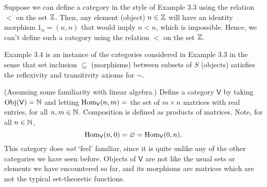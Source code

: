 \begin{xca}
Suppose we can define a category in the style of Example 3.3 using the relation
$<$ on the set $\mathbb{Z}$. Then, any element (object) $n \in \mathbb{Z}$ will have an identity
morphism $1_n = (n, n)$ that would imply $n < n$, which is impossible. Hence,
we can't define such a category using the relation $<$ on the set $\mathbb{Z}$.
\end{xca}

\begin{xca}
Example 3.4 is an instance of the categories considered in Example 3.3 in the
sense that set inclusion $\subseteq$ (morphisms) between subsets of $S$
(objects) satisfies the reflexivity and transitivity axioms for $\sim$.
\end{xca}

\begin{xca}
(Assuming some familiarity with linear algebra.) Define a category $\mathsf{V}$
by taking $\operatorname{Obj}(\mathsf{V}) = \mathbb{N}$ and letting $\operatorname{Hom}_{\mathsf{V}}(n, m) =$
the set of $m \times n$ matrices with real entries, for all $n, m \in \mathbb{N}$.
Composition is defined as products of matrices. Note, for all $n \in \mathbb{N}$,
\[
\operatorname{Hom}_{\mathsf{V}}(n, 0) = \varnothing = \operatorname{Hom}_{\mathsf{V}}(0, n).
\]
This category does \emph{not} `feel' familiar, since it is quite unlike any of
the other categories we have seen before. Objects of $\mathsf{V}$ are not like
the usual sets or elements we have encountered so far, and its morphisms are
matrices which are not the typical set-theoretic functions.
\end{xca}

